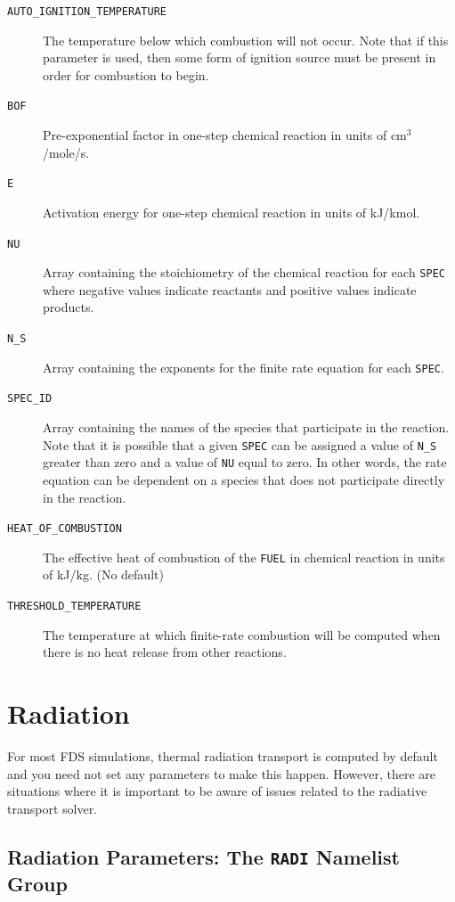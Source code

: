 \documentclass[11pt]{book}
\newcommand{\ct}{\tt\small}
\begin{document}
\begin{description}
\item[{\ct AUTO\_IGNITION\_TEMPERATURE}] The temperature below which combustion will not occur.
Note that if this parameter is used, then some form of ignition source must be present in order for combustion to begin.
\item[{\ct BOF}] Pre-exponential factor in one-step chemical reaction in
units of cm$^3$/mole/s.
\item[{\ct E}] Activation energy for one-step chemical reaction in
units of kJ/kmol.
\item[{\ct NU}] Array containing the stoichiometry of the chemical reaction for each {\ct SPEC} where negative values indicate reactants and positive values indicate products.
\item[{\ct N\_S}] Array containing the exponents for the finite rate equation for each {\ct SPEC}.
\item[{\ct SPEC\_ID}] Array containing the names of the species that participate in the reaction. Note that it is possible that a given {\ct SPEC}
can be assigned a value of {\ct N\_S} greater than zero and a value of {\ct NU} equal to zero. In other words,
the rate equation can be dependent on a species that does not participate directly in the reaction.
\item[{\ct HEAT\_OF\_COMBUSTION}] The effective heat of combustion of the {\ct FUEL} in chemical reaction in units of kJ/kg. (No default)
\item[{\ct THRESHOLD\_TEMPERATURE}] The temperature at which finite-rate combustion will be computed when there is no heat release from other reactions.
\end{description}




\chapter{Radiation}

For most FDS simulations, thermal radiation transport is computed by default and you need not set any
parameters to make this happen. However, there are situations where it is important to be aware of
issues related to the radiative transport solver.

\section{Radiation Parameters: The \texorpdfstring{{\tt RADI}}{RADI} Namelist Group}
\label{info:RADI}
\end{document}
